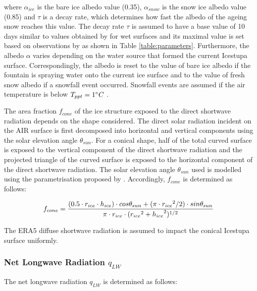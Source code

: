 \documentclass[utf8]{frontiersSCNS} %
\begin{document}
where $\alpha_{ice}$ is the bare ice albedo value (0.35), $\alpha_{snow}$ is the snow ice albedo value (0.85) and
$\tau$ is a decay rate, which determines how fast the albedo of the ageing snow reaches this value.  The decay rate
$\tau$ is assumed to have a base value of 10 days similar to values obtained by \cite{Schmidt_2017} for wet surfaces
and its maximal value is set based on observations by \cite{OerlemansKnap_1998} as shown in Table
\ref{table:parameters}.  Furthermore, the albedo $\alpha$ varies depending on the water source that formed the current
Icestupa surface.  Correspondingly, the albedo is reset to the value of bare ice albedo if the fountain is spraying
water onto the current ice surface and to the value of fresh snow albedo if a snowfall event occurred. Snowfall events
are assumed if the air temperature is below $T_{ppt}=1 \degree C$ \citep{FujitaAgeta_2000}.

The area fraction $f_{cone}$ of the ice structure exposed to the direct shortwave radiation depends on the shape
considered. The direct solar radiation incident on the AIR surface is first decomposed into horizontal and vertical
components using the solar elevation angle $\theta_{sun}$. For a conical shape, half of the total curved surface is
exposed to the vertical component of the direct shortwave radiation and the projected triangle of the curved surface is
exposed to the horizontal component of the direct shortwave radiation. The solar elevation angle $\theta_{sun}$ used is
modelled using the parametrisation proposed by \cite{Woolf_1968}. Accordingly, $f_{cone}$ is determined as follows:

\begin{equation} \begin{split} f_{cone}& =\frac{(0.5 \cdot r_{ice} \cdot h_{ice}) \cdot cos \theta_{sun} +(\pi \cdot
{r_{ice}}^2/2) \cdot sin \theta_{sun} }{\pi \cdot r_{ice} \cdot ({r_{ice}}^2+{h_{ice}}^2)^{1/2}}\\ \end{split}
\label{eqn:f_{cone}} \end{equation}

The ERA5 diffuse shortwave radiation is assumed to impact the conical Icestupa surface uniformly. 

\subsubsection{Net Longwave Radiation \texorpdfstring{$q_{LW}$}{Lg}}

The net longwave radiation $q_{LW}$ is determined as follows:
\end{document}
